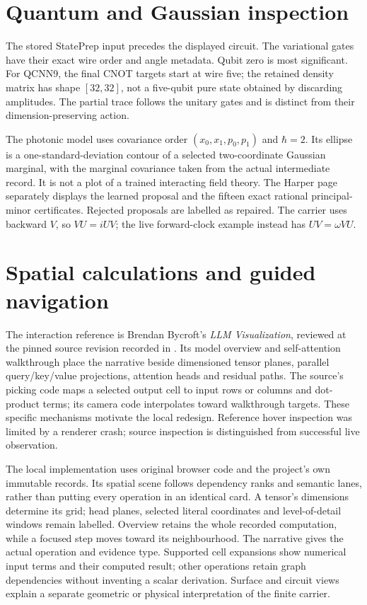 \documentclass[11pt,oneside,openany]{book}
\theoremstyle{definition}\newtheorem{definition}[theorem]{Definition}
\theoremstyle{remark}\newtheorem{remark}[theorem]{Remark}
\begin{document}
\section{Quantum and Gaussian inspection}
The stored StatePrep input precedes the displayed circuit. The variational
gates have their exact wire order and angle metadata. Qubit zero is most
significant. For QCNN9, the final CNOT targets start at wire five; the
retained density matrix has shape $[32,32]$, not a five-qubit pure state
obtained by discarding amplitudes. The partial trace follows the unitary
gates and is distinct from their dimension-preserving action.

The photonic model uses covariance order $(x_0,x_1,p_0,p_1)$ and
$\hbar=2$. Its ellipse is a one-standard-deviation contour of a selected
two-coordinate Gaussian marginal, with the marginal covariance taken from
the actual intermediate record. It is not a plot of a trained interacting
field theory. The Harper page separately displays the learned proposal and
the fifteen exact rational principal-minor certificates. Rejected proposals
are labelled as repaired. The carrier uses backward $V$, so $VU=iUV$;
the live forward-clock example instead has $UV=\omega VU$.

\section{Spatial calculations and guided navigation}
The interaction reference is Brendan Bycroft's \emph{LLM Visualization},
reviewed at the pinned source revision recorded in
.
Its model overview and self-attention walkthrough place the narrative
beside dimensioned tensor planes, parallel query/key/value projections,
attention heads and residual paths. The source's picking code maps a
selected output cell to input rows or columns and dot-product terms;
its camera code interpolates toward walkthrough targets. These specific
mechanisms motivate the local redesign. Reference hover inspection was
limited by a renderer crash; source inspection is distinguished from
successful live observation.

The local implementation uses original browser code and the project's
own immutable records. Its spatial scene follows dependency ranks and
semantic lanes, rather than putting every operation in an identical card.
A tensor's dimensions determine its grid; head planes, selected literal
coordinates and level-of-detail windows remain labelled. Overview retains
the whole recorded computation, while a focused step moves toward its
neighbourhood. The narrative gives the actual operation and evidence type.
Supported cell expansions show numerical input terms and their computed
result; other operations retain graph dependencies without inventing a
scalar derivation. Surface and circuit views explain a separate geometric
or physical interpretation of the finite carrier.
\end{document}
